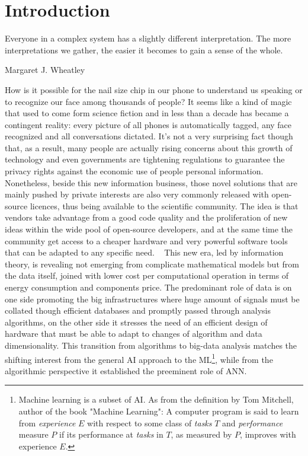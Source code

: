 

\chapter{Introduction}

\epigraph{Everyone in a complex system has a slightly different interpretation. The more interpretations we gather, the easier it becomes to gain a sense of the whole.}{Margaret J. Wheatley}


How is it possible for the nail size chip in our phone to understand us speaking or to recognize our face among thousands of people? 
It seems like a kind of magic that used to come form science fiction and in less than a decade has became a contingent reality: every picture of all phones is automatically tagged, any face recognized and all conversations dictated. 
It's not a very surprising fact though that, as a result, many people are actually rising concerns about this growth of technology and even governments are tightening regulations to guarantee the privacy rights against the economic use of people personal information.
~
Nonetheless, beside this new information business, those novel solutions that are mainly pushed by private interests are also very commonly released with open-source licences, thus being available to the scientific community. The idea is that vendors take advantage from a good code quality and the proliferation of new ideas within the wide pool of open-source developers, and at the same time the community get access to a cheaper hardware and very powerful software tools that can be adapted to any specific need.
~
This new era, led by information theory, is revealing not emerging from complicate mathematical models but from the data itself, joined with lower cost per computational operation in terms of energy consumption and components price. %
The predominant role of data is on one side promoting the big infrastructures where huge amount of signals must be collated though efficient databases and promptly passed through analysis algorithms, on the other side it stresses the need of an efficient design of hardware that must be able to adapt to changes of algorithm and data dimensionality. This transition from algorithms to big-data analysis matches the shifting interest from the general \ac{AI} approach to the \ac{ML}\footnote{Machine learning is a subset of \acs{AI}. As from the definition by Tom Mitchell, author of the book "Machine Learning": A computer program is said to learn from \textit{experience} $E$ with respect to some class of \textit{tasks} $T$ and \textit{performance} measure $P$ if its performance at \textit{tasks} in $T$, as measured by $P$, improves with experience $E$.}, while from the algorithmic perspective it established the preeminent role of \ac{ANN}.

